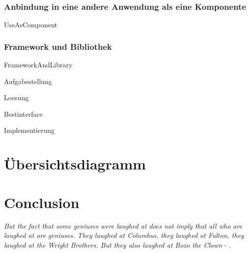 \documentclass{article}
\begin{document}
        \subsubsection{Anbindung in eine andere Anwendung als eine Komponente}
            {UseAsComponent}

        \newpage
        \subsubsection{Framework und Bibliothek}
            {FrameworkAndLibrary}
\newpage



{Aufgabestellung}

{Loesung}


\newpage
{Bestinterface}

\newpage
{Implementierung}

\section{Übersichtsdiagramm}

\section{Conclusion}
\textit{But the fact that some geniuses were laughed at does not imply that all who are laughed at are geniuses. They laughed at Columbus, they laughed at Fulton, they laughed at the Wright Brothers. But they also laughed at Bozo the Clown} -  \textcite{sagan_1993}.

\newpage
\printbibliography[heading = bibintoc, title = Bibliography]    %

\end{document}

